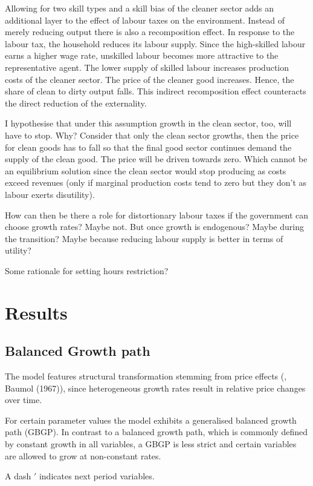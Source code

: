 Allowing for two skill types and a skill bias of the cleaner sector adds an additional layer to the effect of labour taxes on the environment. Instead of merely reducing output there is also a recomposition effect. 
In response to the labour tax, the household reduces its labour supply. Since the high-skilled labour earns a higher wage rate, unskilled labour becomes more attractive to the representative agent. The lower supply of skilled labour increases production costs of the cleaner sector. The price of the cleaner good increases. Hence, the share of clean to dirty output falls. This indirect recomposition effect counteracts the direct reduction of the externality. 

I hypothesise that under this assumption growth in the clean sector, too, will have to stop. Why? Consider that only the clean sector growths, then the price for clean goods has to fall so that the final good sector  continues demand the supply of the clean good. The price will be driven towards zero. Which cannot be an equilibrium solution since the clean sector would stop producing as costs exceed revenues (only if marginal production costs tend to zero but they don't as labour exerts disutility).

How can then be there a role for distortionary labour taxes if the government can choose growth rates? Maybe not. But once growth is endogenous? Maybe during the transition? 
Maybe because reducing labour supply is better in terms of utility? 

Some rationale for setting hours restriction? 

\section{Results}
\subsection{Balanced Growth path}
 The model features structural transformation stemming from price effects (\cite{Ngai2007StructuralGrowth}, Baumol (1967)), since heterogeneous growth rates result in relative price changes over time. 
 
For certain parameter values the model exhibits a generalised balanced growth path (GBGP). In contrast to a balanced growth path, which is commonly defined by constant growth in all variables, a GBGP is less strict and certain variables are allowed to grow at non-constant rates. 


A dash $'$ indicates next period variables.  

